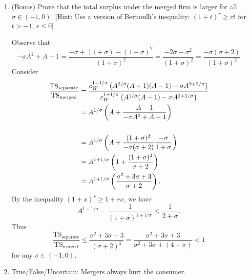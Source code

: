 \documentclass[11pt]{article}
\begin{document}
\begin{enumerate}
    \item (Bonus) Prove that the total surplus under the merged firm is larger for all $\sigma \in (-1,0)$. 
    [Hint: Use a version of Bernoulli's inequality: $(1+t)^r \ge rt$ for $t > -1$, $r \le 0$] 
    \begin{sol}
    Observe that \[
    -\sigma A^2 + A - 1 = \frac{-\sigma + (1+\sigma) - (1+\sigma)^2}{(1+\sigma)^2} = \frac{- 2 \sigma - \sigma^2 }{(1+\sigma)^2} = \frac{-\sigma(\sigma+2)}{(1+\sigma)^2}
    \]
        Consider \begin{align*}
             \frac{\text{TS}_\text{separate}}{\text{TS}_{\text{merged}}} &= \frac{ c_W^{1+1/\sigma} \left({A^{2/\sigma} (A+1)(A-1) - \sigma A^{3+2/\sigma}}\right)}{c_W^{1+1/\sigma} \left({A^{1/\sigma}(A-1) -\sigma A^{2+1/\sigma}}\right)}\\
             &= A^{1/\sigma} \left({A + \frac{A-1}{-\sigma A^2 + A -1}}\right) \\
              \\
             &= A^{1/\sigma} \left({A + \frac{(1+\sigma)^2}{-\sigma (\sigma + 2)} \frac{-\sigma}{1+\sigma}}\right) \\
             &= A^{1+1/\sigma} \left({1 + \frac{(1+\sigma)^2}{\sigma+2}}\right) \\
             &=  A^{1+1/\sigma} \left({\frac{\sigma^2 + 3 \sigma + 3}{\sigma + 2}}\right).
             \end{align*}
             By the inequality $(1+x)^r \ge 1 + rx$, we have 
             \[
             A^{1+1/\sigma} = \frac{1}{(1+\sigma)^{1+1/\sigma}} \le \frac{1}{2+\sigma}.
             \]
             Thus \[
             \frac{\text{TS}_\text{separate}}{\text{TS}_{\text{merged}}} \le \frac{\sigma^2 + 3 \sigma + 3}{(\sigma+2)^2} = \frac{\sigma^2 + 3 \sigma + 3}{\sigma^2 + 3 \sigma + (4 + \sigma)} < 1
             \]
             for any $\sigma \in (-1,0)$. 
    \end{sol}
    \item True/False/Uncertain: Mergers always hurt the consumer.
\end{enumerate}
\end{document}
